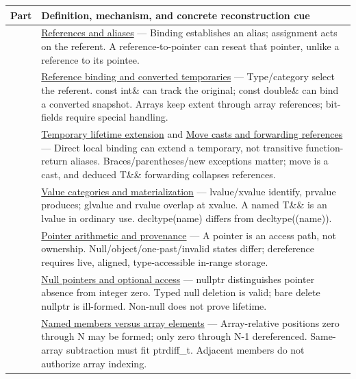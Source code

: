 {\def\LTcaptype{none} %
\begin{longtable}[]{@{}
  >{\raggedright\arraybackslash}p{}
  >{\raggedright\arraybackslash}p{}@{}}
\toprule\noalign{}
\begin{minipage}[b]{\linewidth}\raggedright
Part
\end{minipage} & \begin{minipage}[b]{\linewidth}\raggedright
Definition, mechanism, and concrete reconstruction cue
\end{minipage} \\
\midrule\noalign{}
\endhead
\bottomrule\noalign{}
\endlastfoot
113 & \hyperref[appendix-d6d562ca9fbb]{References and aliases} --- Binding establishes an alias; assignment acts on the referent. A reference-to-pointer can reseat that pointer, unlike a reference to its pointee. \\
114 & \hyperref[appendix-37856d997bb0]{Reference binding and converted temporaries} --- Type/category select the referent. const int\& can track the original; const double\& can bind a converted snapshot. Arrays keep extent through array references; bit-fields require special handling. \\
115 & \hyperref[appendix-a978b29bbbb0]{Temporary lifetime extension} and \hyperref[appendix-0104b704fb11]{Move casts and forwarding references} --- Direct local binding can extend a temporary, not transitive function-return aliases. Braces/parentheses/new exceptions matter; move is a cast, and deduced T\&\& forwarding collapses references. \\
116 & \hyperref[appendix-1121b30eaeb0]{Value categories and materialization} --- lvalue/xvalue identify, prvalue produces; glvalue and rvalue overlap at xvalue. A named T\&\& is an lvalue in ordinary use. decltype(name) differs from decltype((name)). \\
117 & \hyperref[appendix-6af5921bc853]{Pointer arithmetic and provenance} --- A pointer is an access path, not ownership. Null/object/one-past/invalid states differ; dereference requires live, aligned, type-accessible in-range storage. \\
118 & \hyperref[appendix-afae48c31800]{Null pointers and optional access} --- nullptr distinguishes pointer absence from integer zero. Typed null deletion is valid; bare delete nullptr is ill-formed. Non-null does not prove lifetime. \\
119 & \hyperref[appendix-3f7e15effba6]{Named members versus array elements} --- Array-relative positions zero through N may be formed; only zero through N-1 dereferenced. Same-array subtraction must fit ptrdiff\_t. Adjacent members do not authorize array indexing. \\

\end{longtable}}
